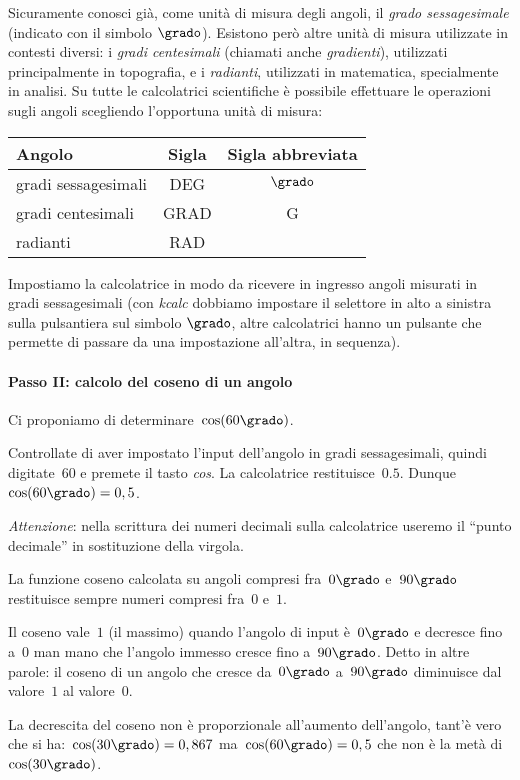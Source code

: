 Sicuramente conosci già, come unità di misura degli angoli, il \emph{grado sessagesimale} (indicato con il simbolo $\grado$). Esistono però altre unità di misura utilizzate in contesti diversi:
i \emph{gradi centesimali} (chiamati anche \emph{gradienti}), utilizzati principalmente in topografia, e i \emph{radianti}, utilizzati in matematica, specialmente in analisi.
Su tutte le calcolatrici scientifiche è possibile effettuare le operazioni sugli angoli scegliendo l'opportuna unità di misura:

\begin{center}
\begin{tabular}{lcc}
\toprule
Angolo & Sigla & Sigla abbreviata \\
\midrule
gradi sessagesimali & DEG & $\grado$ \\
gradi centesimali & GRAD & G \\
radianti & RAD & \\
\bottomrule
\end{tabular}
\end{center}

Impostiamo la calcolatrice in modo da ricevere in ingresso angoli misurati in gradi sessagesimali (con \emph{kcalc} dobbiamo impostare il selettore in alto a sinistra sulla pulsantiera sul simbolo $\grado$, altre calcolatrici hanno un pulsante che permette di passare da una impostazione all'altra, in sequenza).

\paragraph{Passo II: calcolo del coseno di un angolo}

Ci proponiamo di determinare~$\cos(60\grado)$.

Controllate di aver impostato l'input dell'angolo in gradi sessagesimali, quindi
digitate~$60$ e premete il tasto \emph{cos}. La calcolatrice restituisce~$0.5$.
Dunque~$\cos(60\grado)=0,5$.

\emph{Attenzione}: nella scrittura dei numeri decimali sulla calcolatrice useremo il ``punto decimale'' in sostituzione della virgola.

\osservazione
\begin{enumeratea}
\item La funzione coseno calcolata su angoli compresi fra~$0\grado$ e~$90\grado$ restituisce sempre numeri compresi fra~$0$ e~$1$.
\item Il coseno vale~$1$ (il massimo) quando l'angolo di input è~$0\grado$ e decresce fino a~$0$ man mano che l'angolo immesso cresce fino
   a~$90\grado$. Detto in altre parole: il coseno di un angolo che cresce da~$0\grado$ a~$90\grado$ diminuisce dal valore~$1$ al valore~$0$.
\item La decrescita del coseno non è proporzionale all'aumento dell'angolo, tant'è vero che si ha:~$\cos(30\grado)=0,867$
   ma~$\cos(60\grado)=0,5$ che non è la metà di~$\cos(30\grado)$.
\end{enumeratea}


